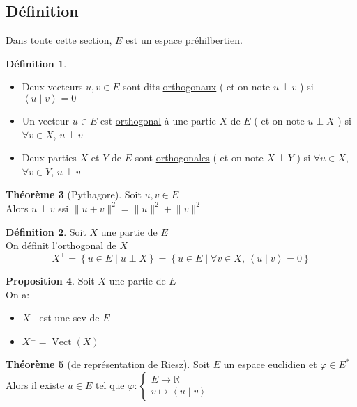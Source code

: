 \documentclass[10pt,a4paper]{article}
\theoremstyle{definition}
\newtheorem{proposition}{Proposition}[section]
\newtheorem{theorem}[proposition]{Théorème}
\newtheorem{definition}[proposition]{Définition}
\DeclareMathOperator{\vect}{Vect}
\newcommand{\vp}[2]{\left< #1 \mid #2 \right>}
\begin{document}
\subsection{Définition}
Dans toute cette section, $E$ est un espace préhilbertien.
\begin{definition}
\hfill
\begin{itemize}
\item Deux vecteurs $u, v \in E$ sont dits \uline{orthogonaux} ( et on note $u \perp v$ ) si $\vp{u}{v} = 0$
\item Un vecteur $u \in E$ est \uline{orthogonal} à une partie $X$ de $E$ ( et on note $u \perp X$ ) si $\forall v \in X$, $u \perp v$
\item Deux parties $X$ et $Y$ de $E$ sont \uline{orthogonales} ( et on note $X \perp Y$ ) si $\forall u \in X$, $\forall v \in Y$, $u \perp v$
\end{itemize}
\end{definition}
\begin{theorem}[Pythagore]
Soit $u, v \in E$ \\
Alors $u \perp v$ ssi $\lVert u + v \rVert^2 = \lVert u \rVert^2 + \lVert v \rVert^2$
\begin{definition}
Soit $X$ une partie de $E$ \\
On définit \uline{l'orthogonal de $X$}
\[ X^\perp = \left\{ u \in E \mid u \perp X \right\} = \left\{ u \in E \mid \forall v \in X,\, \vp{u}{v} = 0 \right\} \]
\end{definition}
\end{theorem}
\begin{proposition}
Soit $X$ une partie de $E$ \\
On a:
\begin{itemize}
\item $X^\perp$ est une sev de $E$
\item $X^\perp = \vect(X)^\perp$
\end{itemize}
\end{proposition}
\begin{theorem}[de représentation de Riesz]
Soit $E$ un espace \uline{euclidien} et $\varphi \in E^*$ \\
Alors il existe $u \in E$ tel que $\varphi: \begin{cases}
E \to \mathbb{R} \\
v \mapsto \vp{u}{v}
\end{cases}$
\end{theorem}
\end{document}
